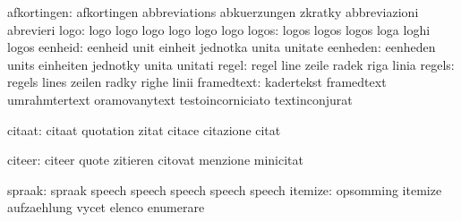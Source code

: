               afkortingen: afkortingen               abbreviations
                           abkuerzungen              zkratky
                           abbreviazioni             abrevieri
                     logo: logo                      logo
                           logo                      logo
                           logo                      logo
                    logos: logos                     logos
                           logos                     loga
                           loghi                     logos
                  eenheid: eenheid                   unit
                           einheit                   jednotka
                           unita                     unitate
                 eenheden: eenheden                  units
                           einheiten                 jednotky
                           unita                     unitati
                    regel: regel                     line
                           zeile                     radek
                           riga                      linia
                   regels: regels                    lines
                           zeilen                    radky
                           righe                     linii
               framedtext: kadertekst                framedtext
                           umrahmtertext             oramovanytext
                           testoincorniciato         textinconjurat

                   citaat: citaat                    quotation
                           zitat                     citace
                           citazione                 citat

                   citeer: citeer                    quote
                           zitieren                  citovat
                           menzione                  minicitat

                   spraak: spraak                    speech 
                           speech                    speech 
                           speech                    speech 
                  itemize: opsomming                 itemize
                           aufzaehlung               vycet
                           elenco                    enumerare

\stopvariables



